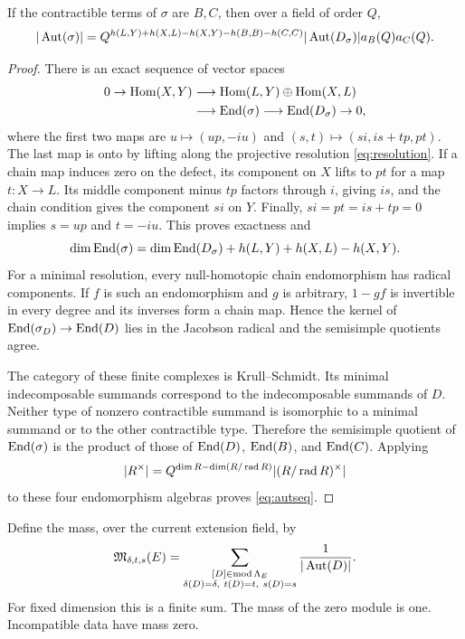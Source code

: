 \begin{lemma}\label{lem:stabilizer}
If the contractible terms of $\sigma$ are $B,C$, then over a field of order $Q$,
\begin{equation}\label{eq:autseq}
 |\operatorname{Aut}(\sigma)|=
 Q^{h(L,Y)+h(X,L)-h(X,Y)-h(B,B)-h(C,C)}|\operatorname{Aut}(D_\sigma)|a_B(Q)a_C(Q).
\end{equation}
\end{lemma}
\begin{proof}
There is an exact sequence of vector spaces
\begin{align*}
0\to\operatorname{Hom}(X,Y)&\longrightarrow\operatorname{Hom}(L,Y)\oplus\operatorname{Hom}(X,L)\\
&\longrightarrow\operatorname{End}(\sigma)\longrightarrow\operatorname{End}(D_\sigma)\to0,
\end{align*}
where the first two maps are $u\mapsto(up,-iu)$ and
$(s,t)\mapsto(si,is+tp,pt)$. The last map is onto by lifting along the projective resolution \eqref{eq:resolution}. If a chain map induces zero on the defect, its component on $X$ lifts to $pt$ for a map $t:X\to L$. Its middle component minus $tp$ factors through $i$, giving $is$, and the chain condition gives the component $si$ on $Y$. Finally, $si=pt=is+tp=0$ implies $s=up$ and $t=-iu$. This proves exactness and
\[
 \dim\operatorname{End}(\sigma)=\dim\operatorname{End}(D_\sigma)+h(L,Y)+h(X,L)-h(X,Y).
\]
For a minimal resolution, every null-homotopic chain endomorphism has radical components. If $f$ is such an endomorphism and $g$ is arbitrary, $1-gf$ is invertible in every degree and its inverses form a chain map. Hence the kernel of $\operatorname{End}(\sigma_D)\to\operatorname{End}(D)$ lies in the Jacobson radical and the semisimple quotients agree.

The category of these finite complexes is Krull--Schmidt. Its minimal indecomposable summands correspond to the indecomposable summands of $D$. Neither type of nonzero contractible summand is isomorphic to a minimal summand or to the other contractible type. Therefore the semisimple quotient of $\operatorname{End}(\sigma)$ is the product of those of $\operatorname{End}(D)$, $\operatorname{End}(B)$, and $\operatorname{End}(C)$. Applying
\[
 |R^\times|=Q^{\dim R-\dim(R/\operatorname{rad} R)}|(R/\operatorname{rad} R)^\times|
\]
to these four endomorphism algebras proves \eqref{eq:autseq}.
\end{proof}

Define the mass, over the current extension field, by
\[
 \mathfrak M_{\delta,t,s}(E)=
 \sum_{\substack{[D]\in\operatorname{mod}\Lambda_E\\
 \delta(D)=\delta,\ t(D)=t,\ s(D)=s}}
 \frac1{|\operatorname{Aut}(D)|}.
\]
For fixed dimension this is a finite sum. The mass of the zero module is one. Incompatible data have mass zero.

